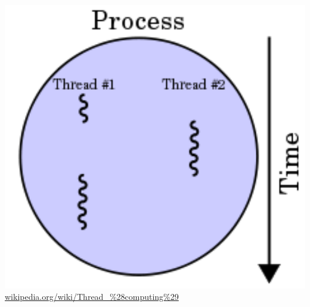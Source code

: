 \documentclass{beamer}
\begin{document}
\begin{frame}
\begin{columns}
\begin{column}{0.30\textwidth}
\begin{center}
\includegraphics[width=1.0\textwidth]{Illustrations/multithreading.png} \\
{\small \url{wikipedia.org/wiki/Thread_\%28computing\%29}}
\end{center}

\end{column}
\end{columns}

\end{frame}
\end{document}

